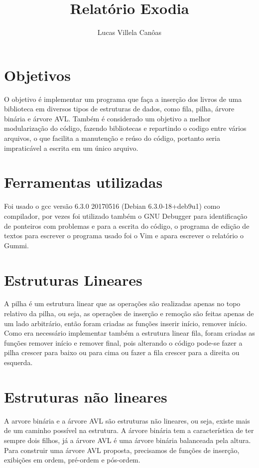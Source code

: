 \documentclass[11pt]{article}
\title{\textbf{Relatório Exodia}}
\author{Lucas Villela Canôas}
\date{}
\begin{document}
\maketitle

\section{Objetivos}

O objetivo é implementar um programa que faça a inserção dos livros de uma biblioteca em diversos tipos de estruturas de dados, como fila, pilha, árvore binária e árvore AVL.
Também é considerado um objetivo a melhor modularização do código, fazendo bibliotecas e repartindo o codigo entre vários arquivos, o que facilita a manutenção e reúso do código, portanto seria impraticável a escrita em um único arquivo.

\section {Ferramentas utilizadas}

Foi usado o gcc versão 6.3.0 20170516 (Debian 6.3.0-18+deb9u1) como compilador, por vezes foi utilizado também o GNU Debugger para identificação de ponteiros com problemas e para a escrita do código, o programa de edição de textos para escrever o programa usado foi o Vim e apara escrever o relatório o Gummi.


\section {Estruturas Lineares}

A pilha é um estrutura linear que as operações são realizadas apenas no topo relativo da pilha, ou seja, as operações de inserção e remoção são feitas apenas de um lado arbitrário, então foram criadas as funções inserir início, remover início. Como era necessário implementar também a estrutura linear fila, foram criadas as funções remover início e remover final, pois alterando o código pode-se fazer a pilha crescer para baixo ou para cima ou fazer a fila crescer para a direita ou esquerda.

\section {Estruturas não lineares}

A arvore binária e a árvore AVL são estruturas não lineares, ou seja, existe mais de um caminho possível na estrutura. A árvore binária tem a característica de ter sempre dois filhos, já a árvore AVL é uma árvore binária balanceada pela altura. Para construir uma árvore AVL proposta, precisamos de funções de inserção, exibições em ordem, pré-ordem e pós-ordem.
\end{document}
